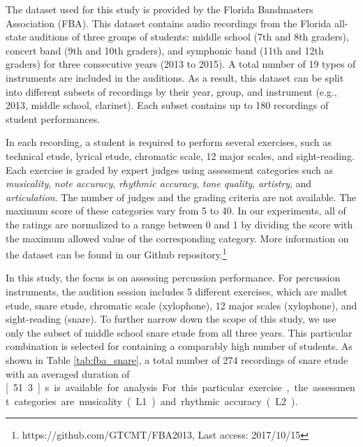 \documentclass[conference]{IEEEtran}
\begin{document}


The dataset used for this study is provided by the Florida Bandmasters Association (FBA). This dataset contains audio recordings from the Florida all-state auditions of three groups of students: middle school (7th and 8th graders), concert band (9th and 10th graders), and symphonic band (11th and 12th graders) for three consecutive years (2013 to 2015). A total number of 19 types of instruments are included in the auditions. As a result, this dataset can be split into different subsets of recordings by their year, group, and instrument (e.g., 2013, middle school, clarinet). Each subset contains up to 180 recordings of student performances.  

In each recording, a student is required to perform several exercises, such as technical etude, lyrical etude, chromatic scale, 12 major scales, and sight-reading. Each exercise is graded by expert judges using assessment categories such as \textit{musicality}, \textit{note accuracy}, \textit{rhythmic accuracy}, \textit{tone quality}, \textit{artistry}, and \textit{articulation}. The number of judges and the grading criteria are not available. The maximum score of these categories vary from 5 to 40. In our experiments, all of the ratings are normalized to a range between 0 and 1 by dividing the score with the maximum allowed value of the corresponding category. %
More information on the dataset can be found in our Github repository.\footnote{https://github.com/GTCMT/FBA2013, Last access: 2017/10/15}%

In this study, the focus is on assessing percussion performance. For percussion instruments, the audition session includes 5 different exercises, which are mallet etude, snare etude, chromatic scale (xylophone), 12 major scales (xylophone), and sight-reading (snare). To further narrow down the scope of this study, we use only the subset of middle school snare etude from all three years. This particular combination is selected for containing a comparably high number of students. As shown in Table \ref{tab:fba_snare}, a total number of 274 recordings of snare etude with an averaged duration of \unit[51.3]{s} is available for analysis. For this particular exercise, the assessment categories are musicality (L1) and rhythmic accuracy (L2).
\end{document}
